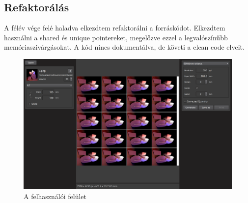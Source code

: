 \subsection{Refaktorálás}

A félév vége felé haladva elkezdtem refaktorálni a forráskódot. Elkezdtem használni a shared és unique pointereket, megelőzve ezzel a legvalószínűbb memóriaszivárgásokat. A kód nincs dokumentálva, de követi a clean code elveit. 

\begin{figure}[h]
    \includegraphics[width=\textwidth]{figures/ui_showcase.png}
    \caption{A felhasználói felület}
    \label{fig:ui_screenshot}
\end{figure}